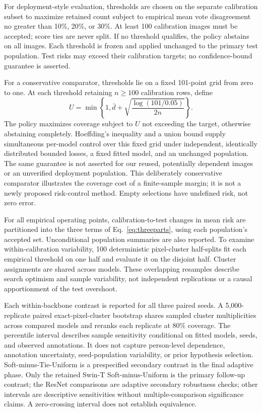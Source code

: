 \documentclass[pdflatex,sn-mathphys-num]{sn-jnl}
\begin{document}
For deployment-style evaluation, thresholds are chosen on the separate calibration subset to maximize retained count subject to empirical mean vote disagreement no greater than 10\%, 20\%, or 30\%. At least 100 calibration images must be accepted; score ties are never split. If no threshold qualifies, the policy abstains on all images. Each threshold is frozen and applied unchanged to the primary test population. Test risks may exceed their calibration targets; no confidence-bound guarantee is asserted.

For a conservative comparator, thresholds lie on a fixed 101-point grid from zero to one. At each threshold retaining $n\geq100$ calibration rows, define
\begin{equation}
U=\min\!\left\{1,\bar d+\sqrt{\frac{\log(101/0.05)}{2n}}\right\}.
\end{equation}
The policy maximizes coverage subject to $U$ not exceeding the target, otherwise abstaining completely. Hoeffding's inequality \cite{hoeffding1963} and a union bound supply simultaneous per-model control over this fixed grid under independent, identically distributed bounded losses, a fixed fitted model, and an unchanged population. The same guarantee is not asserted for our reused, potentially dependent images or an unverified deployment population. This deliberately conservative comparator illustrates the coverage cost of a finite-sample margin; it is not a newly proposed risk-control method. Empty selections have undefined risk, not zero error.

For all empirical operating points, calibration-to-test changes in mean risk are partitioned into the three terms of Eq.~\ref{eq:threeparts}, using each population's accepted set. Unconditional population summaries are also reported. To examine within-calibration variability, 100 deterministic pixel-cluster half-splits fit each empirical threshold on one half and evaluate it on the disjoint half. Cluster assignments are shared across models. These overlapping resamples describe search optimism and sample variability, not independent replications or a causal apportionment of the test overshoot.

Each within-backbone contrast is reported for all three paired seeds. A 5,000-replicate paired exact-pixel-cluster bootstrap shares sampled cluster multiplicities across compared models and reranks each replicate at 80\% coverage. The percentile interval describes sample sensitivity conditional on fitted models, seeds, and observed annotations. It does not capture person-level dependence, annotation uncertainty, seed-population variability, or prior hypothesis selection. Soft-minus-Tie-Uniform is a prespecified secondary contrast in the final adaptive phase. Only the retained Swin-T Soft-minus-Uniform is the primary follow-up contrast; the ResNet comparisons are adaptive secondary robustness checks; other intervals are descriptive sensitivities without multiple-comparison significance claims. A zero-crossing interval does not establish equivalence.
\end{document}
